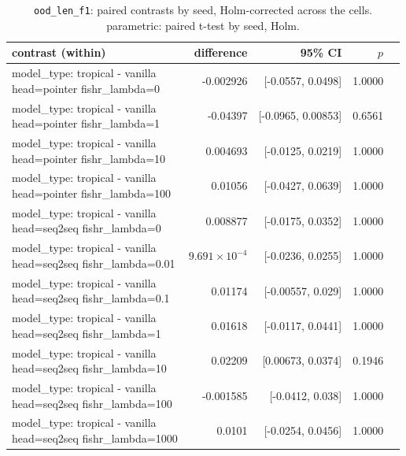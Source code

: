 \documentclass[10pt]{article}
\makeatletter
\newcommand{\stackcell}[1]{\begin{tabular}[t]{@{}l@{}}#1\end{tabular}}
\makeatother
\begin{document}
{\small
\begin{longtable}{lrrrl}
\caption{\texttt{ood\_len\_f1}: paired contrasts by seed, Holm-corrected across the cells. parametric: paired t-test by seed, Holm.}\label{tab:paired-ood_len_f1}\\
\toprule
contrast (within) & difference & 95\% CI & $p$ & \\
\midrule
\endhead
\stackcell{model\_type: tropical - vanilla\\\footnotesize head=pointer fishr\_lambda=0 } & -0.002926 & [-0.0557, 0.0498] & 1.0000 & \\
\stackcell{model\_type: tropical - vanilla\\\footnotesize head=pointer fishr\_lambda=1 } & -0.04397 & [-0.0965, 0.00853] & 0.6561 & \\
\stackcell{model\_type: tropical - vanilla\\\footnotesize head=pointer fishr\_lambda=10 } & 0.004693 & [-0.0125, 0.0219] & 1.0000 & \\
\stackcell{model\_type: tropical - vanilla\\\footnotesize head=pointer fishr\_lambda=100 } & 0.01056 & [-0.0427, 0.0639] & 1.0000 & \\
\stackcell{model\_type: tropical - vanilla\\\footnotesize head=seq2seq fishr\_lambda=0 } & 0.008877 & [-0.0175, 0.0352] & 1.0000 & \\
\stackcell{model\_type: tropical - vanilla\\\footnotesize head=seq2seq fishr\_lambda=0.01 } & $9.691\times10^{-4}$ & [-0.0236, 0.0255] & 1.0000 & \\
\stackcell{model\_type: tropical - vanilla\\\footnotesize head=seq2seq fishr\_lambda=0.1 } & 0.01174 & [-0.00557, 0.029] & 1.0000 & \\
\stackcell{model\_type: tropical - vanilla\\\footnotesize head=seq2seq fishr\_lambda=1 } & 0.01618 & [-0.0117, 0.0441] & 1.0000 & \\
\stackcell{model\_type: tropical - vanilla\\\footnotesize head=seq2seq fishr\_lambda=10 } & 0.02209 & [0.00673, 0.0374] & 0.1946 & \\
\stackcell{model\_type: tropical - vanilla\\\footnotesize head=seq2seq fishr\_lambda=100 } & -0.001585 & [-0.0412, 0.038] & 1.0000 & \\
\stackcell{model\_type: tropical - vanilla\\\footnotesize head=seq2seq fishr\_lambda=1000 } & 0.0101 & [-0.0254, 0.0456] & 1.0000 & \\

\end{longtable}}
\end{document}
